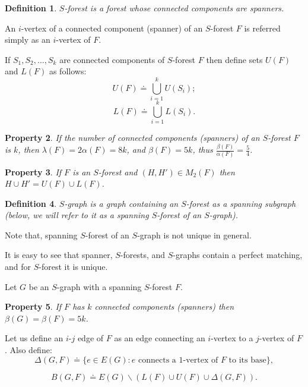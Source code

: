 \documentclass[a4paper, 12pt]{article}
\newtheorem{definition}{Definition}[section]
\newtheorem{property}[definition]{Property}
\begin{document}
\begin{definition}\label{SForest}
$S$-forest is a forest whose connected components are spanners.
\end{definition}

An $i$-vertex of a connected component (spanner) of an $S$-forest
$F$ is referred simply as an $i$-vertex of $F$.

If $S_1,S_2,...,S_k$ are connected components of $S$-forest $F$ then
define sets $U(F)$ and $L(F)$ as follows:
$$U(F) \doteq \bigcup_{i=1}^k{U(S_i)};$$
$$L(F) \doteq \bigcup_{i=1}^k{L(S_i)}.$$

\begin{property} \label{S-forest_lambda=2alpha=8k}
If the number of connected components (spanners) of an $S$-forest
$F$ is $k$, then $\lambda(F) = 2\alpha(F) = 8k$, and $\beta(F) =
5k$, thus $\frac{\beta(F)}{\alpha(F)} = \frac{5}{4}$.
\end{property}

\begin{property} \label{S-forest_HH'_is_LU}
If $F$ is an $S$-forest and $(H,H') \in M_2(F)$ then $H \cup H' =
U(F) \cup L(F)$.
\end{property}

\begin{definition}\label{SGraph}
$S$-graph is a graph containing an $S$-forest as a spanning
subgraph (below, we will refer to it as a spanning $S$-forest of an
$S$-graph).
\end{definition}

Note that, spanning $S$-forest of an $S$-graph is not unique in
general.

It is easy to see that spanner, $S$-forests, and $S$-graphs contain
a perfect matching, and for $S$-forest it is unique.

Let $G$ be an $S$-graph with a spanning $S$-forest $F$.

\begin{property} \label{S-graph_beta=5k}
If $F$ has $k$ connected components (spanners) then $\beta(G) =
\beta(F) = 5k$.
\end{property}

Let us define an $i$-$j$ edge of $F$ as an edge connecting an
$i$-vertex to a $j$-vertex of $F$. Also define:
$$\Delta(G,F) \doteq \{e \in E(G) : \text{$e$ connects a $1$-vertex of $F$ to its base}\},$$

$$B(G,F) \doteq E(G) \backslash (L(F)\cup U(F) \cup \Delta(G, F)).$$
\end{document}
